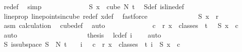 \begin{isabellebody}
\ redef\ \isamarkupfalse%
\ simp\isanewline
\ \ \ \ \ \ \ \ \ \ \isamarkupfalse%
\ \isamarkupfalse%
\ {\isachardoublequoteopen}S{}\ x\ {\isasymin}\ cube\ N{\isacharprime}{\kern0pt}\ {\isacharparenleft}{\kern0pt}t{\isacharplus}{\kern0pt}{}{\isacharparenright}{\kern0pt}{\isachardoublequoteclose}\ \isamarkupfalse%
\ S{}{\isacharunderscore}{\kern0pt}def\ is{\isacharunderscore}{\kern0pt}line{\isacharunderscore}{\kern0pt}def\ \isamarkupfalse%
\ line{\isacharunderscore}{\kern0pt}prop\ line{\isacharunderscore}{\kern0pt}points{\isacharunderscore}{\kern0pt}in{\isacharunderscore}{\kern0pt}cube\ redef\ x{\isacharunderscore}{\kern0pt}def\ \isamarkupfalse%
\ fastforce\isanewline
\ \ \ \ \ \ \ \ \ \ \isamarkupfalse%
\ \isamarkupfalse%
\ {\isachardoublequoteopen}{\isasymchi}\ {\isacharparenleft}{\kern0pt}S{}\ x{\isacharparenright}{\kern0pt}\ {\isacharless}{\kern0pt}\ r{\isachardoublequoteclose}\ \ \isamarkupfalse%
\ asm\ calculation\ \isamarkupfalse%
\ cube{\isacharunderscore}{\kern0pt}def\ \isamarkupfalse%
\ auto\isanewline
\ \ \ \ \ \ \ \ \ \ \isamarkupfalse%
\ \isamarkupfalse%
\ {\isachardoublequoteopen}{\isasymexists}c\ {\isacharless}{\kern0pt}\ r{\isachardot}{\kern0pt}\ {\isasymforall}x\ {\isasymin}\ classes\ {}\ t\ {}{\isachardot}{\kern0pt}\ {\isasymchi}\ {\isacharparenleft}{\kern0pt}S{}\ x{\isacharparenright}{\kern0pt}\ {\isacharequal}{\kern0pt}\ c{\isachardoublequoteclose}\ \isamarkupfalse%
\ auto\isanewline
\ \ \ \ \ \ \ \ \isamarkupfalse%
\isanewline
\ \ \ \ \ \ \ \ \isamarkupfalse%
\ \isamarkupfalse%
\ {\isacharquery}{\kern0pt}thesis\ \isamarkupfalse%
\ lc{\isacharunderscore}{\kern0pt}def\ {\isacartoucheopen}i\ {\isacharequal}{\kern0pt}\ {}{\isacartoucheclose}\ \isamarkupfalse%
\ auto\isanewline
\ \ \ \ \ \ \isamarkupfalse%
\isanewline
\isanewline
\isanewline
\ \ \ \ \isamarkupfalse%
\isanewline
\ \ \ \ \isamarkupfalse%
\ {\isachardoublequoteopen}{\isacharparenleft}{\kern0pt}{\isasymexists}S{\isachardot}{\kern0pt}\ is{\isacharunderscore}{\kern0pt}subspace\ S\ {}\ N{\isacharprime}{\kern0pt}\ {\isacharparenleft}{\kern0pt}t\ {\isacharplus}{\kern0pt}\ {}{\isacharparenright}{\kern0pt}\ {\isasymand}\ {\isacharparenleft}{\kern0pt}{\isasymforall}i\ {\isasymin}\ {\isacharbraceleft}{\kern0pt}{\isachardot}{\kern0pt}{\isachardot}{\kern0pt}{}{\isacharbraceright}{\kern0pt}{\isachardot}{\kern0pt}\ {\isasymexists}c\ {\isacharless}{\kern0pt}\ r{\isachardot}{\kern0pt}\ {\isacharparenleft}{\kern0pt}{\isasymforall}x\ {\isasymin}\ classes\ {}\ t\ i{\isachardot}{\kern0pt}\ {\isasymchi}\ {\isacharparenleft}{\kern0pt}S\ x{\isacharparenright}{\kern0pt}\ {\isacharequal}{\kern0pt}\ c{\isacharparenright}{\kern0pt}{\isacharparenright}{\kern0pt}{\isacharparenright}{\kern0pt}\ {\isachardoublequoteclose}\ \isamarkupfalse%

\end{isabellebody}
